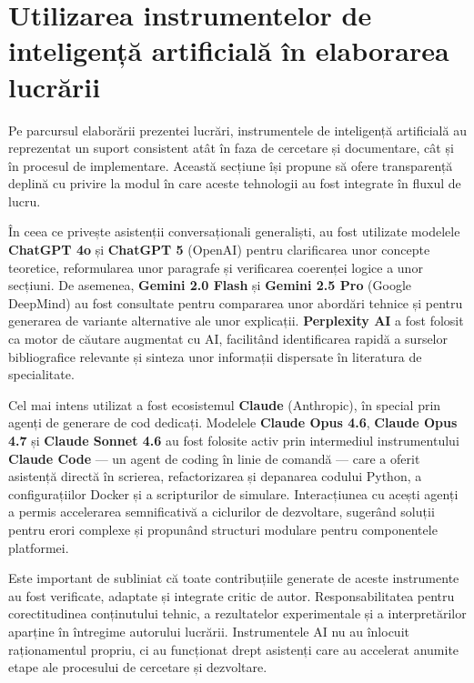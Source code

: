 \documentclass[../../main.tex]{subfiles}
\begin{document}
\newpage
\section{Utilizarea instrumentelor de inteligență artificială în elaborarea lucrării}

Pe parcursul elaborării prezentei lucrări, instrumentele de inteligență artificială au reprezentat un suport consistent atât în faza de cercetare și documentare, cât și în procesul de implementare. Această secțiune își propune să ofere transparență deplină cu privire la modul în care aceste tehnologii au fost integrate în fluxul de lucru.

În ceea ce privește asistenții conversaționali generaliști, au fost utilizate modelele \textbf{ChatGPT 4o} și \textbf{ChatGPT 5} (OpenAI) pentru clarificarea unor concepte teoretice, reformularea unor paragrafe și verificarea coerenței logice a unor secțiuni. De asemenea, \textbf{Gemini 2.0 Flash} și \textbf{Gemini 2.5 Pro} (Google DeepMind) au fost consultate pentru compararea unor abordări tehnice și pentru generarea de variante alternative ale unor explicații. \textbf{Perplexity AI} a fost folosit ca motor de căutare augmentat cu AI, facilitând identificarea rapidă a surselor bibliografice relevante și sinteza unor informații dispersate în literatura de specialitate.

Cel mai intens utilizat a fost ecosistemul \textbf{Claude} (Anthropic), în special prin agenți de generare de cod dedicați. Modelele \textbf{Claude Opus 4.6}, \textbf{Claude Opus 4.7} și \textbf{Claude Sonnet 4.6} au fost folosite activ prin intermediul instrumentului \textbf{Claude Code} --- un agent de coding în linie de comandă --- care a oferit asistență directă în scrierea, refactorizarea și depanarea codului Python, a configurațiilor Docker și a scripturilor de simulare. Interacțiunea cu acești agenți a permis accelerarea semnificativă a ciclurilor de dezvoltare, sugerând soluții pentru erori complexe și propunând structuri modulare pentru componentele platformei.

Este important de subliniat că toate contribuțiile generate de aceste instrumente au fost verificate, adaptate și integrate critic de autor. Responsabilitatea pentru corectitudinea conținutului tehnic, a rezultatelor experimentale și a interpretărilor aparține în întregime autorului lucrării. Instrumentele AI nu au înlocuit raționamentul propriu, ci au funcționat drept asistenți care au accelerat anumite etape ale procesului de cercetare și dezvoltare.
\end{document}
